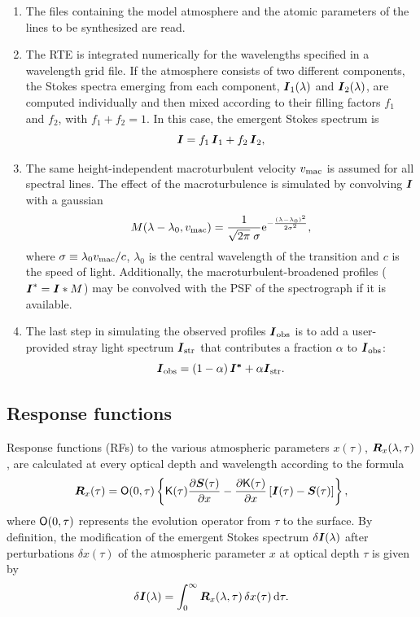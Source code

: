 \documentclass[11pt]{report}
\def\vec#1{\mbox{\boldmath $ #1$}}
\def\tens#1{\ifmmode\mathchoice{\mbox{$\sf\displaystyle#1$}}
{\mbox{$\sf\textstyle#1$}}
{\mbox{$\sf\scriptstyle#1$}}
{\mbox{$\sf\scriptscriptstyle#1$}}\else
\hbox{$\sf\textstyle#1$}\fi}
\begin{document}
\begin{enumerate}
\item The files containing the model atmosphere and the atomic parameters 
of the lines to be synthesized are read. 
\item The RTE is integrated numerically for the wavelengths specified
in a wavelength grid file. If the atmosphere consists of two
different components, the Stokes spectra emerging from each component,
$\vec{I}_1(\lambda)$ and $\vec{I}_2(\lambda)$, are computed
individually and then mixed according to their filling factors
$f_1$ and $f_2$, with $f_1 + f_2=1$. In this case, the emergent Stokes 
spectrum is
\begin{displaymath}
\vec{I} = f_1 \, \vec{I}_1 + f_2 \, \vec{I}_2,
\end{displaymath}
\item The same height-independent macroturbulent velocity $v_{\rm mac}$ 
is assumed for all spectral lines. The effect of the macroturbulence is 
simulated by convolving $\vec{I}$ with a gaussian 
\begin{displaymath}
M(\lambda - \lambda_0, v_{\rm mac}) = \frac{1}{\sqrt{2\pi} \; \sigma} 
{\rm e}^{{-\frac{(\lambda-\lambda_0)^2}{2\sigma^2}}},
\end{displaymath}
where $\sigma \equiv \lambda_0 v_{\rm mac}/c$, $\lambda_0$ is the central
wavelength of the transition and $c$ is the speed of light. Additionally, 
the macroturbulent-broadened profiles ($\vec{I}^* = \vec{I}*M$) may be 
convolved with the PSF of the spectrograph if it is available. 
\item The last step in simulating the observed profiles $\vec{I}_{\rm obs}$ 
is to add a user-provided stray light spectrum $\vec{I}_{\rm str}$ that 
contributes a fraction $\alpha$ to $\vec{I}_{\rm obs}$:
\begin{displaymath}
\vec{I}_{\rm obs} = (1-\alpha) \, \vec{I^*} + \alpha \vec{I}_{\rm str}.
\end{displaymath}
\end{enumerate}

\subsection{Response functions}
Response functions (RFs) to the various atmospheric parameters $x(\tau)$,
$\vec R_x (\lambda, \tau)$, are calculated at every optical depth and
wavelength according to the formula
\begin{displaymath}
   \vec R_x (\tau) = \tens{O}(0, \tau)
   \left\{ \tens{K}(\tau) \frac {\partial \vec{S}(\tau)} {\partial x} -
   \frac {\partial \tens{K}(\tau)} {\partial x}
   \left[ \vec{I}(\tau) - \vec{S}(\tau) \right ] \right\} ,
\end{displaymath}
where $\tens{O}(0,\tau)$ represents the evolution operator from $\tau$
to the surface. By definition, the modification of the emergent Stokes
spectrum $\delta \vec{I}(\lambda)$ after perturbations $\delta x(\tau)$
of the atmospheric parameter $x$ at optical depth $\tau$ is given by
\begin{equation}
\label{defrf}
\delta \vec{I}(\lambda) = \int_0^{\infty} \vec{R}_x (\lambda, \tau) \, \delta x(\tau) \, {\rm d}\tau.
\end{equation} 
\end{document}

